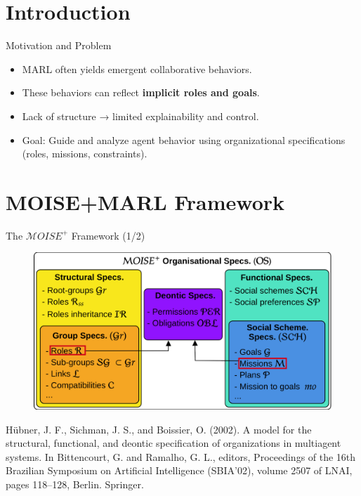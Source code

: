 \documentclass[9pt, aspectratio=169]{beamer}
\begin{document}



% 
% 
% 
% 
% 

\addtocounter{framenumber}{-1}

\section{Introduction}

\begin{frame}{Motivation and Problem}
  \begin{itemize}
    \item MARL often yields emergent collaborative behaviors.
    \item These behaviors can reflect \textbf{implicit roles and goals}.
    \item Lack of structure → limited explainability and control.
    \item Goal: Guide and analyze agent behavior using \textbf{}organizational specifications\textbf{} (roles, missions, constraints).
  \end{itemize}
\end{frame}

\section{MOISE+MARL Framework}

\begin{frame}{The $\mathcal{M}OISE^+$ Framework (1/2)}

  \begin{figure}
    \centering
    \includegraphics[width=0.75\linewidth]{figures/moise_model.png}
  \end{figure}

  \begin{spacing}{0.25}
    {\tiny Hübner, J. F., Sichman, J. S., and Boissier, O. (2002).
      A model for the structural, functional, and deontic specification of
      organizations in multiagent systems.
      In Bittencourt, G. and Ramalho, G. L., editors, Proceedings of the 16th Brazilian Symposium on Artificial Intelligence (SBIA’02), volume 2507 of LNAI, pages 118–128, Berlin. Springer.}
  \end{spacing}

\end{frame}
\end{document}
